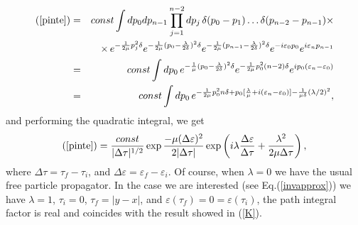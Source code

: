 \documentclass[a4paper,12pt]{article}
\begin{document}
\begin{eqnarray}
(\ref{pinte})&=&const \int dp_0 dp_{n-1}\prod_{j=1}^{n-2}dp_j\, 
\delta(p_0-p_1)\dots \delta(p_{n-2}-p_{n-1})\times
\nonumber \\
&&\times\, e^{-\frac{1}{2\mu}p_j^2\delta}
e^{-\frac{1}{2\mu}(p_0-\frac{\lambda}{2\delta})^2\delta}
e^{-\frac{1}{2\mu}(p_{n-1}-\frac{\lambda}{2\delta})^2\delta}
e^{-i\varepsilon_0 p_0}e^{i\varepsilon_n p_{n-1}}\nonumber \\
&=&const \int dp_0\, e^{-\frac{1}{\mu}(p_0-\frac{\lambda}{2\delta})^2\delta}
e^{-\frac{1}{2\mu}p_0^2 (n-2)\delta}
e^{ip_0(\varepsilon_n-\varepsilon_0)}\nonumber \\
&=&const \int dp_0\, e^{-\frac{1}{2\mu}p_0^2 n\delta+p_0[\frac{\lambda}{\mu}+i(\varepsilon_n-\varepsilon_0)]-\frac{1}{\mu\delta}(\lambda/2)^2},
\end{eqnarray}
and performing the quadratic integral, we get
\begin{equation}
(\ref{pinte})=\frac{const}{|\Delta\tau|^{1/2}} \exp {\frac{-\mu(\Delta\varepsilon)^2 }{2|
\Delta\tau|}}\exp\left( i\lambda \frac{\Delta\varepsilon}{\Delta\tau}+\frac{\lambda^2}{2\mu\Delta\tau}\right),
\end{equation}
where $\Delta\tau=\tau_f-\tau_i$, and $\Delta\varepsilon=\varepsilon_f-\varepsilon_i$.   
Of course, when $\lambda=0$ we have the usual free particle propagator. 
In the case we are interested (see Eq.(\ref{invapprox})) we have $\lambda=1$, $\tau_i=0$, $\tau_f=|y-x|$, and $\varepsilon(\tau_f)=0=\varepsilon(\tau_i)$, the path integral factor is real and coincides with the result showed in (\ref{K}).
\end{document}
